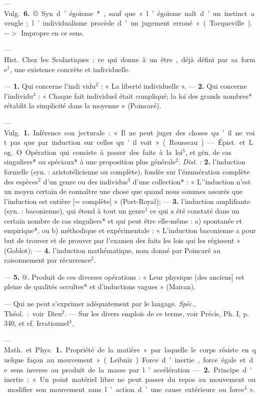 \begin{itemize}[leftmargin=1cm, label=, itemsep=1pt]
— \si{Vulg.} {\bf 6.} ©. Syn. d’égoïsme*,
sauf que « l’égoïsme naît d’un instinct aveugle; l’individualisme procède d’un jugement erroné » (Tocqueville). $->$ Impropre en ce sens.

 — \si{Hist.}
Chez les Scolastiques : ce qui donne
à un être, déjà défini par sa forme$^1$,
une existence concrète et individuelle.

 — {\bf 1.} Qui concerne l'indi
vidu$^2$ : « La liberté individuelle ». —
 {\bf 2.} Qui concerne l’individu$^3$ : « Chaque
fait individuel était compliqué; la
loï des grands nombres* rétablit la
simplicité dans la moyenne » (Poincaré).

 — \si{Vulg.} {\bf 1.} Inférence con
jecturale : « Il ne peut juger des
choses qu’il ne voit pas que par
induction sur celles qu'il voit »
(Rousseau).

— \si{Épist.} et \si{Log.} O. Opération
qui consiste à passer des faits à la
loi$^5$, et gén. de cas singuliers* ou
spéciaux* à une proposition plus
générale$^2$. {\it Dist.} : {\bf 2.} l'induction formelle (syn. : aristotélicienne ou complète), fondée sur l’énumération
complète des espèces$^2$ d’un genre
ou des individus$^3$ d’une collection* :
« L'’induction n’est un moyen certain de connaître une chose que
quand nous sommes assurés que
l'induction est entière [= complète] » (Port-Royal); — {\bf 3.} l’induction amplifiante (syn. : baconienne),
qui étend à tout un genre$^1$ ce qui a
été constaté dans un certain nombre
de cas singuliers* et qui peut être
elle-même : a) spontanée et empirique*, ou b) méthodique et expérimentale : « L’induction baconienne a pour but de trouver et de
prouver par l’examen des faits les
lois qui les régissent » (Goblot); —
 {\bf 4.} l'induction mathématique, nom
donné par Poincaré au raisonnement par récurrence$^2$.

— {\bf 5.} @. Produit de ces diverses
opérations : « Leur physique (des
anciens] est pleine de qualités occultes* et d'inductions vagues »
(Mairan).

 — Qui ne peut s'exprimer
adéquatement par le langage. {\it Spéc.},
\si{Théol.} : voir Dieu$^2$. — Sur les divers
emplois de ce terme, voir Précis,
Ph. I, p. 340, et cf. Irrationnel$^3$.

 — \si{Math.} et \si{Phys.} {\bf 1.} Propriété
de la matière « par laquelle le corps
résiste en quelque façon au mouvement » (Leibniz). Force d'inertie,
force égale et de sens inverse au
produit de la masse par l'accélération. — {\bf 2.} Principe d'inertie : « Un
point matériel libre ne peut passer
du repos au mouvement ou modifier
son mouvement sans l’action d’une
cause extérieure ou force$^4$ ».


\end{itemize}
